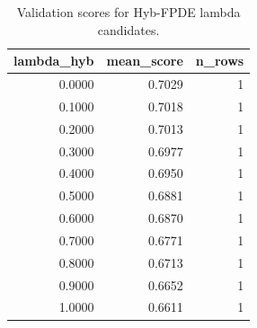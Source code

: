 \begin{table}[t]
\caption{Validation scores for Hyb-FPDE lambda candidates.}
\label{tab:lambda_distribution_computed}
\centering
\begin{tabular}{rrr}
\toprule
lambda\_hyb & mean\_score & n\_rows \\
\midrule
0.0000 & 0.7029 & 1 \\
0.1000 & 0.7018 & 1 \\
0.2000 & 0.7013 & 1 \\
0.3000 & 0.6977 & 1 \\
0.4000 & 0.6950 & 1 \\
0.5000 & 0.6881 & 1 \\
0.6000 & 0.6870 & 1 \\
0.7000 & 0.6771 & 1 \\
0.8000 & 0.6713 & 1 \\
0.9000 & 0.6652 & 1 \\
1.0000 & 0.6611 & 1 \\
\bottomrule
\end{tabular}

\end{table}
